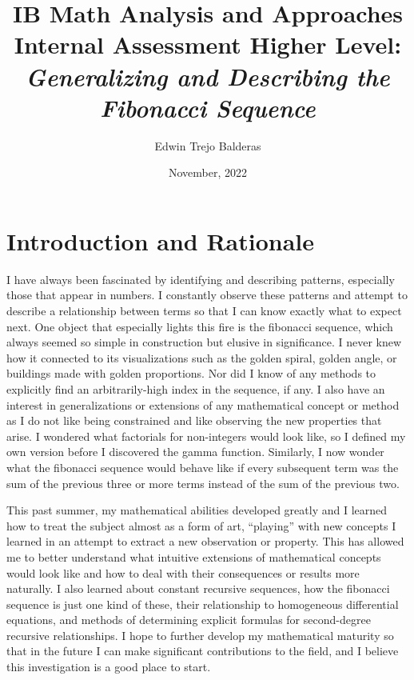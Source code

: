 \documentclass[11pt]{article}
\title{IB Math Analysis and Approaches Internal Assessment Higher Level: \emph{Generalizing and Describing the Fibonacci Sequence}}
\author{Edwin Trejo Balderas}
\date{November, 2022}
\begin{document}
\singlespacing

\maketitle

\newpage

\tableofcontents

\newpage

\doublespacing

\section{Introduction and Rationale}

I have always been fascinated by identifying and describing patterns, especially those that appear in numbers. I constantly observe these patterns and attempt to describe a relationship between terms so that I can know exactly what to expect next. One object that especially lights this fire is the fibonacci sequence, which always seemed so simple in construction but elusive in significance. I never knew how it connected to its visualizations such as the golden spiral, golden angle, or buildings made with golden proportions. Nor did I know of any methods to explicitly find an arbitrarily-high index in the sequence, if any. I also have an interest in generalizations or extensions of any mathematical concept or method as I do not like being constrained and like observing the new properties that arise. I wondered what factorials for non-integers would look like, so I defined my own version before I discovered the gamma function. Similarly, I now wonder what the fibonacci sequence would behave like if every subsequent term was the sum of the previous three or more terms instead of the sum of the previous two. 

This past summer, my mathematical abilities developed greatly and I learned how to treat the subject almost as a form of art, “playing” with new concepts I learned in an attempt to extract a new observation or property. This has allowed me to better understand what intuitive extensions of mathematical concepts would look like and how to deal with their consequences or results more naturally. I also learned about constant recursive sequences, how the fibonacci sequence is just one kind of these, their relationship to homogeneous differential equations, and methods of determining explicit formulas for second-degree recursive relationships. I hope to further develop my mathematical maturity so that in the future I can make significant contributions to the field, and I believe this investigation is a good place to start.
\end{document}
